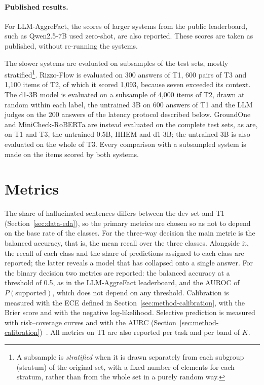 \paragraph{Published results.} For LLM-AggreFact, the scores of larger systems from the public leaderboard, such as
Qwen2.5-7B used zero-shot, are also reported. These scores are taken as published, without re-running the systems.

The slower systems are evaluated on subsamples of the test sets, mostly stratified\footnote{A subsample is
\emph{stratified} when it is drawn separately from each subgroup (stratum) of the original set, with a fixed number of
elements for each stratum, rather than from the whole set in a purely random way.}. Rizzo-Flow is evaluated on 300
answers of T1, 600 pairs of T3 and 1{,}100 items of T2, of which it scored 1{,}093, because seven exceeded its context.
The d1-3B model is evaluated on a subsample of 4{,}000 items of T2, drawn at random within each label, the untrained 3B on 600 answers of T1 and the
LLM judges on the 200 answers of the latency protocol described below. GroundOne and MiniCheck-RoBERTa are
instead evaluated on the complete test sets, as are, on T1 and T3, the untrained 0.5B, HHEM and d1-3B; the untrained 3B
is also evaluated on the whole of T3. Every comparison with a subsampled system is made on the items scored by both
systems.

\section{Metrics}
\label{sec:setup-metrics}

The share of hallucinated sentences differs between the dev set and T1 (Section~\ref{sec:data-eda}), so the primary
metrics are chosen so as not to depend on the base rate of the classes. For the three-way decision the main metric is
the balanced accuracy, that is, the mean recall over the three classes. Alongside it, the recall of each class and the
share of predictions assigned to each class are reported; the latter reveals a model that has collapsed onto a single
answer. For the binary decision two metrics are reported: the balanced accuracy at a threshold of 0.5, as in the
LLM-AggreFact leaderboard, and the AUROC of $P(\text{supported})$, which does not depend on any threshold. Calibration is
measured with the ECE defined in Section~\ref{sec:method-calibration}, with the Brier score and with the negative
log-likelihood. Selective prediction is measured with risk--coverage curves and with the AURC
(Section~\ref{sec:method-calibration})~\cite{geifman2017selective}. All metrics on T1 are also reported per task and per
band of $K$.

